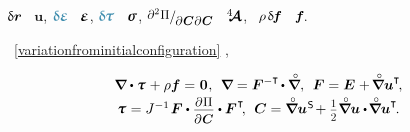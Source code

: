\vspace{-0.1em}\noindent
{}
${\updelta\hspace{-0.1ex}\bm{r}}$ ~$\bm{u}$,
${\infinimentpetitdeformationdevariation\hspace{-0.15ex}}$ ~$\infinitesimaldeformation$,
$\varbivalent{\hspace{-0.15ex}\cauchystress}$ ~$\linearstress$,
${\scalebox{.95}{$ \raisemath{.15em}{\scalebox{0.92}{$\partial^2 \hspace{.1ex} \potential$}} / \hspace{-0.1ex} \raisemath{-0.3em}{\scalebox{.92}{$\partial \hspace{.1ex} \bm{C} \hspace{.1ex} \partial \hspace{.1ex} \bm{C}$}} $}}$ ~$\hspace{.08ex}{^4\hspace{-0.72ex}\bm{\mathcal{A}}}\hspace{.08ex}$,
~${\hspace{-0.1ex} \rho \hspace{.25ex} \variation{\hspace{-0.2ex}\bm{f}}}$ ~${\hspace{-0.1ex} \bm{f}\hspace{-0.2ex}}$.

 ~\eqref{variationfrominitialconfiguration} , 

\nopagebreak\vspace{-0.25em}\begin{equation}\label{nonlinear:setofequations}
\begin{array}{c}
\boldnabla \dotp \cauchystress \hspace{.15ex} + \rho \bm{f} = \hspace{.1ex} \bm{0} \hspace{.1ex},
\:\:
\boldnabla = \bm{F}^{-\T} \hspace{-0.2ex} \dotp \boldnablacircled ,
\:\:
\bm{F} = \UnitDyad \hspace{.1ex} + \hspace{-0.2ex} \boldnablacircled {\bm{u}}^{\T} \hspace{-0.3ex},
\\[.2em]
%
\cauchystress \hspace{.1ex} = J^{-1} \hspace{.2ex} \bm{F} \dotp \scalebox{0.9}{$ \displaystyle \frac{\raisemath{-0.125em}{\partial\hspace{.1ex} \potential}}{\raisemath{-0.1em}{\partial\hspace{.1ex} \bm{C}}} $} \dotp \bm{F}^{\hspace{.1ex}\T} \hspace{-0.4ex},
\:\:
\bm{C} = \boldnablacircled {\bm{u}}^{\hspace{.1ex}\mathsf{S}} \hspace{-0.3ex} + \smalldisplaystyleonehalf \boldnablacircled \bm{u} \dotp \hspace{-0.25ex} \boldnablacircled \bm{u}^{\T} \hspace{-0.25ex}.
\end{array}
\end{equation}

